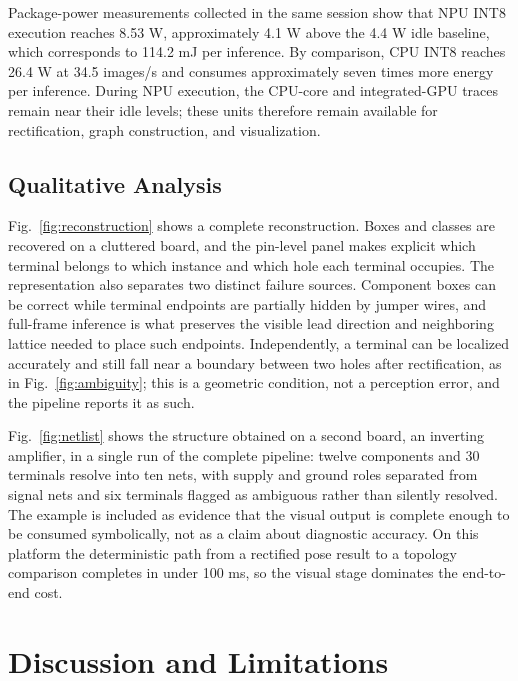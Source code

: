\documentclass[conference]{IEEEtran}
\begin{document}
Package-power measurements collected in the same session show that NPU INT8
execution reaches 8.53 W, approximately 4.1 W above the 4.4 W idle baseline,
which corresponds to 114.2 mJ per inference. By comparison, CPU INT8 reaches
26.4 W at 34.5 images/s and consumes approximately seven times more energy per
inference. During NPU execution, the CPU-core and integrated-GPU traces remain
near their idle levels; these units therefore remain available for
rectification, graph construction, and visualization.

\subsection{Qualitative Analysis}

Fig.~\ref{fig:reconstruction} shows a complete reconstruction. Boxes and classes
are recovered on a cluttered board, and the pin-level panel makes explicit which
terminal belongs to which instance and which hole each terminal occupies. The
representation also separates two distinct failure sources.
Component boxes can be correct while terminal endpoints are partially hidden by
jumper wires, and full-frame inference is what preserves the visible lead
direction and neighboring lattice needed to place such endpoints. Independently,
a terminal can be localized accurately and still fall near a boundary between
two holes after rectification, as in Fig.~\ref{fig:ambiguity}; this is a
geometric condition, not a perception error, and the pipeline reports it as such.


Fig.~\ref{fig:netlist} shows the structure obtained on a second board, an
inverting amplifier, in a single run of the complete pipeline: twelve components
and 30 terminals resolve into ten nets, with supply and ground roles separated
from signal nets and six terminals flagged as ambiguous rather than silently
resolved. The example is included
as evidence that the visual output is complete enough to be consumed
symbolically, not as a claim about diagnostic accuracy. On this platform the
deterministic path from a rectified pose result to a topology comparison
completes in under 100 ms, so the visual stage dominates the end-to-end cost.


\section{Discussion and Limitations}
\end{document}
